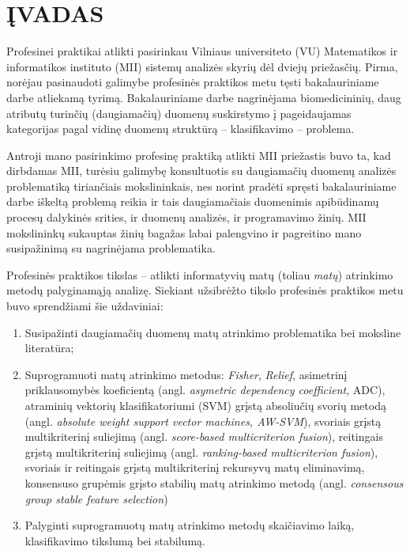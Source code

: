\section*{ĮVADAS}

Profesinei praktikai atlikti pasirinkau Vilniaus universiteto (VU) Matematikos ir informatikos instituto (MII) sistemų analizės skyrių dėl dviejų priežasčių. Pirma, norėjau pasinaudoti galimybe profesinės praktikos metu tęsti bakalauriniame darbe atliekamą tyrimą. Bakalauriniame darbe nagrinėjama biomedicininių, daug atributų turinčių (daugiamačių) duomenų suskirstymo į pageidaujamas kategorijas pagal vidinę duomenų struktūrą -- klasifikavimo -- problema.

Antroji mano pasirinkimo profesinę praktiką atlikti MII priežastis buvo ta, kad dirbdamas MII, turėsiu galimybę konsultuotis su daugiamačių duomenų analizės problematiką tiriančiais mokslininkais, nes norint pradėti spręsti bakalauriniame darbe iškeltą problemą reikia ir tais daugiamačiais duomenimis apibūdinamų procesų dalykinės srities, ir duomenų analizės, ir programavimo žinių. MII mokslininkų sukauptas žinių bagažas labai palengvino ir pagreitino mano susipažinimą su nagrinėjama problematika.

Profesinės praktikos tikslas -- atlikti informatyvių matų (toliau \textit{matų}) atrinkimo metodų palyginamąją analizę. Siekiant užsibrėžto tikslo profesinės praktikos metu buvo sprendžiami šie uždaviniai:
\begin{enumerate}
  \item Susipažinti daugiamačių duomenų matų atrinkimo problematika bei moksline literatūra;
  \item Suprogramuoti matų atrinkimo metodus: 
\textit{Fisher}, \textit{Relief},
asimetrinį priklausomybės koeficientą (angl. \textit{asymetric dependency coefficient}, ADC),
atraminių vektorių klasifikatoriumi (SVM) grįstą absoliučių svorių metodą (angl. \textit{absolute weight support vector machines, AW-SVM}),
svoriais grįstą multikriterinį suliejimą (angl. \textit{score-based multicriterion fusion}),
reitingais grįstą multikriterinį suliejimą (angl. \textit{ranking-based multicriterion fusion}),
svoriais ir reitingais grįstą multikriterinį rekursyvų matų eliminavimą\cite{5611484},
konsensuso grupėmis grįsto stabilių matų atrinkimo metodą\cite{loscalzo2009consensus} (angl. \textit{consensous group stable feature selection})
  \item Palyginti suprogramuotų matų atrinkimo metodų skaičiavimo laiką, klasifikavimo tikslumą bei stabilumą.
\end{enumerate}

